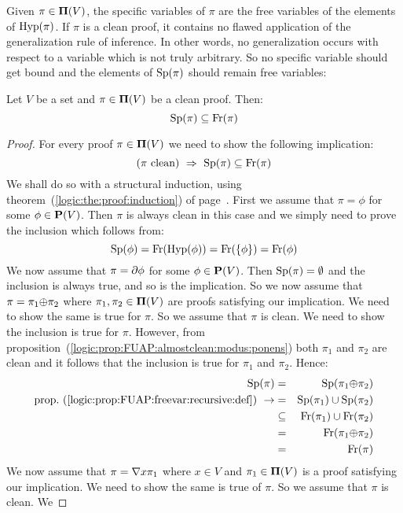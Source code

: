 Given $\pi\in\mbox{${\bf\Pi}(V)$}$, the specific variables of $\pi$ are the free
variables of the elements of $\mbox{\rm Hyp}(\pi)$. If $\pi$ is a clean proof,
it contains no flawed application of the generalization rule of
inference. In other words, no generalization occurs with respect to
a variable which is not truly  arbitrary. So no specific variable
should get bound and the elements of $\mbox{\rm Sp}(\pi)$ should remain free
variables:

\begin{prop}\label{logic:prop:FUAP:cleanproof:spec:free}
Let $V$ be a set and $\pi\in\mbox{${\bf\Pi}(V)$}$ be a clean proof. Then:
    \[
    \mbox{\rm Sp}(\pi)\subseteq\mbox{\rm Fr}(\pi)
    \]
\end{prop}
\begin{proof}
For every proof $\pi\in\mbox{${\bf\Pi}(V)$}$ we need to show the following
implication:
    \[
    (\mbox{$\pi$ clean})\ \Rightarrow\ \spec(\pi)\subseteq\free(\pi)
    \]
We shall do so with a structural induction, using
theorem~(\ref{logic:the:proof:induction}) of
page~\pageref{logic:the:proof:induction}. First we assume that
$\pi=\phi$ for some $\phi\in\mbox{${\bf P}(V)$}$. Then $\pi$ is always clean in this
case and we simply need to prove the inclusion which follows from:
    \[
    \mbox{\rm Sp}(\phi)=\mbox{\rm Fr}(\mbox{\rm Hyp}(\phi))=\mbox{\rm Fr}(\{\phi\})=\mbox{\rm Fr}(\phi)
    \]
We now assume that $\pi=\mbox{$\partial$}\phi$ for some $\phi\in\mbox{${\bf P}(V)$}$. Then
$\mbox{\rm Sp}(\pi)=\emptyset$ and the inclusion is always true, and so is
the implication. So we now assume that $\pi=\pi_{1}\mbox{$\oplus$}\pi_{2}$
where $\pi_{1},\pi_{2}\in\mbox{${\bf\Pi}(V)$}$ are proofs satisfying our
implication. We need to show the same is true for $\pi$. So we
assume that $\pi$ is clean. We need to show the inclusion is true
for $\pi$. However, from
proposition~(\ref{logic:prop:FUAP:almostclean:modus:ponens}) both
$\pi_{1}$ and $\pi_{2}$ are clean and it follows that the inclusion
is true for $\pi_{1}$ and $\pi_{2}$. Hence:
    \begin{eqnarray*}
    \spec(\pi)&=&\spec(\pi_{1}\pon\pi_{2})\\
        \mbox{prop.~(\ref{logic:prop:FUAP:freevar:recursive:def})}\ \rightarrow
        &=&\spec(\pi_{1})\cup\spec(\pi_{2})\\
        &\subseteq&\free(\pi_{1})\cup\free(\pi_{2})\\
        &=&\free(\pi_{1}\pon\pi_{2})\\
        &=&\free(\pi)
    \end{eqnarray*}
We now assume that $\pi=\mbox{$\nabla$} x\pi_{1}$ where $x\in V$ and
$\pi_{1}\in\mbox{${\bf\Pi}(V)$}$ is a proof satisfying our implication. We need to
show the same is true of $\pi$. So we assume that $\pi$ is clean. We

\end{proof}
